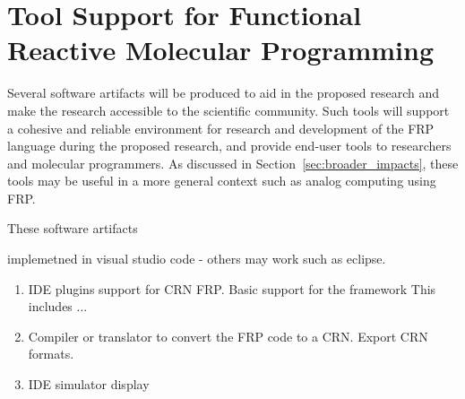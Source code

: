 
\section{Tool Support for Functional Reactive Molecular Programming}
\label{sec:software_support}

Several software artifacts will be produced to aid in the proposed research and make the research accessible to the scientific community.  Such tools will support a cohesive and reliable environment for research and development of the FRP language during the proposed research, and provide end-user tools to researchers and molecular programmers.  As discussed in Section~\ref{sec:broader_impacts}, these tools may be useful in a more general context such as analog computing using FRP.

These software artifacts 

implemetned in visual studio code - others may work such as eclipse.

\begin{enumerate}
	\item IDE plugins support for CRN FRP.  Basic support for the framework  This includes ...  
	
	\item Compiler or translator to convert the FRP code to a CRN.  Export CRN formats.
	
	\item IDE simulator display
\end{enumerate}



